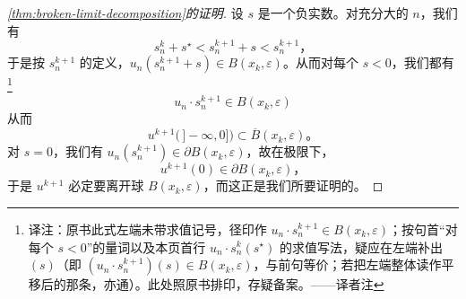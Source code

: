 \begin{proof}[\cref{thm:broken-limit-decomposition}的证明]
设 $s$ 是一个负实数。对充分大的 $n$，我们有
\[
s_{n}^{k}+s^{\star}<s_{n}^{k+1}+s<s_{n}^{k+1}\text{，}
\]
于是按 $s_{n}^{k+1}$ 的定义，$u_{n}(s_{n}^{k+1}+s)\in B(x_{k},\varepsilon)$。从而对每个 $s<0$，我们都有\footnote{译注：原书此式左端未带求值记号，径印作 $u_{n}\cdot s_{n}^{k+1}\in B(x_{k},\varepsilon)$；按句首“对每个 $s<0$”的量词以及本页首行 $u_{n}\cdot s_{n}^{k}(s^{\star})$ 的求值写法，疑应在左端补出 $(s)$（即 $(u_{n}\cdot s_{n}^{k+1})(s)\in B(x_{k},\varepsilon)$，与前句等价；若把左端整体读作平移后的那条\trLoop，亦通）。此处照原书排印，存疑备案。——译者注}
\[
u_{n}\cdot s_{n}^{k+1}\in B(x_{k},\varepsilon)
\]
从而
\[
u^{k+1}\bigl(\,]-\infty,0]\bigr)\subset\overline{B}(x_{k},\varepsilon)\text{。}
\]
对 $s=0$，我们有 $u_{n}(s_{n}^{k+1})\in\partial B(x_{k},\varepsilon)$，故在极限下，
\[
u^{k+1}(0)\in\partial B(x_{k},\varepsilon)\text{，}
\]
于是 $u^{k+1}$ 必定要离开球 $B(x_{k},\varepsilon)$，而这正是我们所要证明的。
\end{proof}
